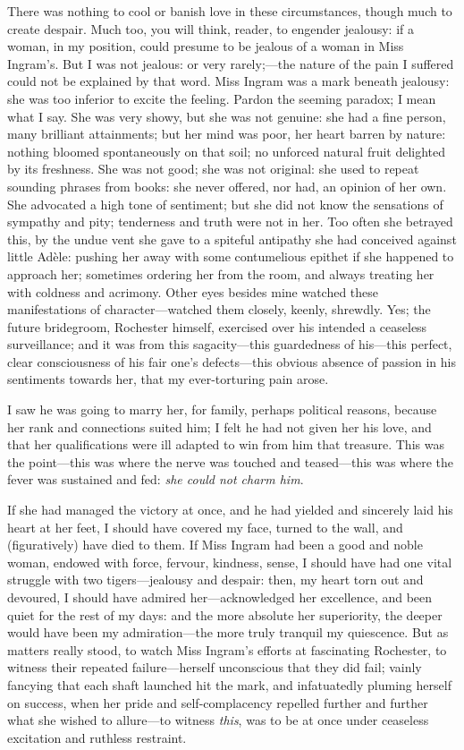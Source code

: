 There was nothing to cool or banish love in these circumstances, though
much to create despair. Much too, you will think, reader, to engender
jealousy: if a woman, in my position, could presume to be jealous of a
woman in Miss Ingram's. But I was not jealous: or very rarely;---the
nature of the pain I suffered could not be explained by that word. Miss
Ingram was a mark beneath jealousy: she was too inferior to excite the
feeling. Pardon the seeming paradox; I mean what I say. She was very
showy, but she was not genuine: she had a fine person, many brilliant
attainments; but her mind was poor, her heart barren by nature: nothing
bloomed spontaneously on that soil; no unforced natural fruit delighted
by its freshness. She was not good; she was not original: she used to
repeat sounding phrases from books: she never offered, nor had, an
opinion of her own. She advocated a high tone of sentiment; but she did
not know the sensations of sympathy and pity; tenderness and truth were
not in her. Too often she betrayed this, by the undue vent she gave to
a spiteful antipathy she had conceived against little Adèle: pushing her
away with some contumelious epithet if she happened to approach her;
sometimes ordering her from the room, and always treating her with
coldness and acrimony. Other eyes besides mine watched these
manifestations of character---watched them closely, keenly, shrewdly.
Yes; the future bridegroom, \Mr{} Rochester himself, exercised over his
intended a ceaseless surveillance; and it was from this sagacity---this
guardedness of his---this perfect, clear consciousness of his fair one's
defects---this obvious absence of passion in his sentiments towards her,
that my ever-torturing pain arose.

I saw he was going to marry her, for family, perhaps political reasons,
because her rank and connections suited him; I felt he had not given her
his love, and that her qualifications were ill adapted to win from him
that treasure. This was the point---this was where the nerve was
touched and teased---this was where the fever was sustained and fed:
\emph{she could not charm him}.

If she had managed the victory at once, and he had yielded and sincerely
laid his heart at her feet, I should have covered my face, turned to the
wall, and (figuratively) have died to them. If Miss Ingram had been a
good and noble woman, endowed with force, fervour, kindness, sense, I
should have had one vital struggle with two tigers---jealousy and
despair: then, my heart torn out and devoured, I should have admired
her---acknowledged her excellence, and been quiet for the rest of my
days: and the more absolute her superiority, the deeper would have been
my admiration---the more truly tranquil my quiescence. But as matters
really stood, to watch Miss Ingram's efforts at fascinating \Mr{}
Rochester, to witness their repeated failure---herself unconscious that
they did fail; vainly fancying that each shaft launched hit the mark,
and infatuatedly pluming herself on success, when her pride and
self-complacency repelled further and further what she wished to
allure---to witness \emph{this}, was to be at once under ceaseless
excitation and ruthless restraint.

